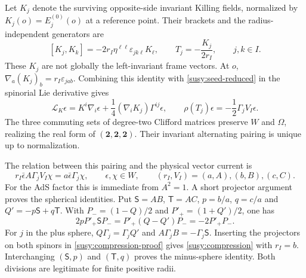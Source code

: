 Let $K_j$ denote the surviving opposite-side invariant Killing fields, normalized by $K_j(o)=E_j^{(0)}(o)$ at a reference point. Their brackets and the radius-independent generators are
\begin{equation}\label{susy:even-normalization}
 [K_j,K_k]=-2r_I\eta^{\ell\ell}\varepsilon_{jk\ell}K_\ell,
 \qquad T_j=-\frac{K_j}{2r_I},\qquad j,k\in I.
\end{equation}
These $K_j$ are not globally the left-invariant frame vectors. At $o$,
$\nabla_a(K_j)_b=r_I\varepsilon_{jab}$. Combining this identity with \eqref{susy:seed-reduced} in the spinorial Lie derivative gives
\begin{equation}\label{susy:even-odd}
 \mathcal L_K\epsilon=K^i\nabla_i\epsilon+\frac14(\nabla_iK_j)\Gamma^{ij}\epsilon,
 \qquad
 \rho(T_j)\epsilon=-\frac12\Gamma_jV_I\epsilon.
\end{equation}
The three commuting sets of degree-two Clifford matrices preserve $W$ and $\Omega$, realizing the real form of $(\mathbf2,\mathbf2,\mathbf2)$. Their invariant alternating pairing is unique up to normalization.

The relation between this pairing and the physical vector current is
\begin{equation}\label{susy:compression}
 r_I\bar\epsilon A\Gamma_jV_I\chi
 =a\bar\epsilon\Gamma_j\chi,
 \qquad \epsilon,\chi\in W,
 \qquad (r_I,V_I)=(a,A),(b,B),(c,C).
\end{equation}
For the AdS factor this is immediate from $A^2=1$. A short projector argument proves the spherical identities. Put
$\mathsf S=AB$, $\mathsf T=AC$, $p=b/a$, $q=c/a$ and
$Q'= -p\mathsf S+q\mathsf T$. With
$P_-=(1-Q)/2$ and $P'_+=(1+Q')/2$, one has
\begin{equation}\label{susy:compression-proof}
 2pP'_+\mathsf SP_-=P'_+(Q-Q')P_-=-2P'_+P_-.
\end{equation}
For $j$ in the plus sphere, $Q\Gamma_j=\Gamma_jQ'$ and
$A\Gamma_jB=-\Gamma_j\mathsf S$. Inserting the projectors on both spinors in \eqref{susy:compression-proof} gives \eqref{susy:compression} with $r_I=b$. Interchanging $(\mathsf S,p)$ and $(\mathsf T,q)$ proves the minus-sphere identity. Both divisions are legitimate for finite positive radii.

